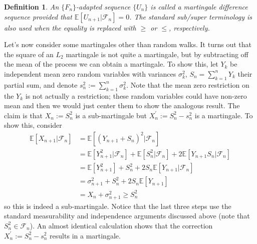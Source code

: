 \documentclass[12pt]{article}
\newcommand{\E}{\mathbb{E}}
\newtheorem{definition}{Definition}
\begin{document}
\begin{definition}
An $\{F_n\}$-adapted sequence $\{U_n\}$ is called a \textit{martingale difference sequence} provided that $\E[U_{n+1}|\mathcal{F}_n] = 0$. The standard sub/super terminology is also used when the equality is replaced with 
$\geq$ or $\leq$, respectively. 
\end{definition}

Let's now consider some martingales other than random walks. It turns out that the square of an $L_2$ martingale is not quite a martingale, but by subtracting off the mean of the process we can obtain a martingale. 
To show this, let $Y_k$ be independent mean zero random variables with variances $\sigma_k^2$, $S_n = \sum_{k = 1}^{n} Y_k$ their partial sum, and denote $s_n^2 := \sum_{k = 1}^{n} \sigma_k^2$. Note that the mean zero restriction on the $Y_k$ is not actually a restriction; these random variables could have 
non-zero mean and then we would just center them to show the analogous result. The claim 
is that $X_n := S_n^2$ is a sub-martingale but $X_n^\prime := S_n^2 - s_n^2$ is a martingale.  To show this, consider 
\begin{align*}
\E[X_{n + 1}|\mathcal{F}_n] &= \E\left[\left(Y_{n + 1} + S_n \right)^2 \bigg| \mathcal{F}_n \right] \\
					   &= \E[Y_{n + 1}^2|\mathcal{F}_n] + \E[S_n^2|\mathcal{F}_n] + 2\E[Y_{n+1}S_n|\mathcal{F}_n] \\
					   &= \E[Y_{n + 1}^2] + S_n^2 + 2 S_n \E[Y_{n+1}|\mathcal{F}_n] \\
					   &= \sigma_{n + 1}^2 + S_n^2 + 2S_n \E[Y_{n+1}] \\
					   &= X_n + \sigma_{n + 1}^2 \geq S_n^2
\end{align*}
so this is indeed a sub-martingale. Notice that the last three steps use the standard measurability and independence arguments discussed above (note that $S_n^2 \in \mathcal{F}_n$). 
An almost identical calculation shows that the correction $X_n^\prime := S_n^2 - s_n^2$ results in a martingale. 
\end{document}
